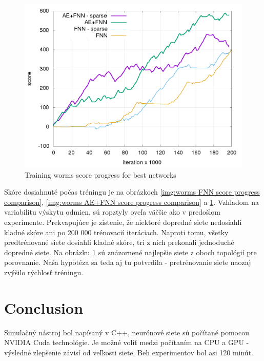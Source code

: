 \documentclass[10pt,a4paper]{article}
\begin{document}
\begin{figure}[!h]
  \centering
  \includegraphics[scale=0.4]{../../results/rl_worms/training_progress.png}
  \caption{Training worms score progress for best networks}
  \label{img:Training worms score progress for best networks}
\end{figure}

Skóre dosiahnuté počas tréningu je na obrázkoch
\ref{img:worms FNN score progress comparison}, \ref{img:worms AE+FNN score progress comparison}
a   \ref{img:Training worms score progress for best networks}.
Vzhľadom na variabilitu výskytu odmien, sú ropztyly oveľa väčšie ako v predošlom experimente.
Prekvapujúce je zistenie, že niektoré dopredné siete nedosiahli kladné skóre ani po 200 000
trénovacií iteráciach. Naproti tomu, všetky predtrénované siete dosiahli kladné skóre,
tri z nich prekonali jednoduché dopredné siete. Na obrázku \ref{img:Training worms score progress for best networks}
sú znázornené najlepšie siete z oboch topológií pre porovnanie.
Naša hypotéza sa teda aj tu potvrdila - pretrénovanie siete naozaj zvýšilo rýchlosť
tréningu.




\newpage
\section{Conclusion}

Simulačný nástroj bol napísaný v C++, neurónové siete sú počítané pomocou NVIDIA Cuda
technológie. Je možné voliť medzi počítaním na CPU a GPU - výsledné zlepšenie závisí
od veľkosti siete. Beh experimentov bol asi 120 minút.
\end{document}
